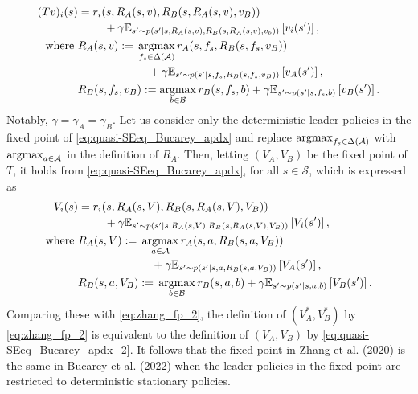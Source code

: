 \documentclass{acml}
\providecommand{\argmax}{\operatornamewithlimits{argmax}} %
\providecommand{\E}{\mathbb{E}} %
\providecommand{\where}{\mathrm{where~}}
\begin{document}
\begin{subequations}\label{eq:quasi-SEeq_Bucarey_apdx}
	\begin{align}
		(Tv)_i(s)&=\begin{multlined}[t]
		    r_i(s,R_A(s,v),R_B(s,R_A(s,v),v_B)) \\
                + \gamma\E_{s'\sim p(s'|s,R_A(s,v),R_B(s,R_A(s,v),v_b))}\left[v_i(s')\right],
		\end{multlined}\\
		\where 
		&R_A(s,v):=\begin{multlined}[t]
		    \argmax_{f_s\in\Delta(\mathcal{A})} r_A(s,f_s,R_B(s,f_s,v_B)) \\
                + \gamma\E_{s'\sim p(s'|s,f_s,R_B(s,f_s,v_B))}\left[v_A(s')\right],
		\end{multlined}\\
		&R_B(s,f_s,v_B):=\argmax_{b\in\mathcal{B}} r_B(s,f_s,b) + \gamma\E_{s'\sim p(s'|s,f_s,b)}\left[v_B(s')\right].
	\end{align}
\end{subequations}
Notably, $\gamma=\gamma_A=\gamma_B$.
Let us consider only the deterministic leader policies in the fixed point of \cref{eq:quasi-SEeq_Bucarey_apdx} and replace $\argmax_{f_s\in\Delta(\mathcal{A})}$ with $\argmax_{a\in\mathcal{A}}$ in the definition of $R_A$.
Then, letting $(V_A,V_B)$ be the fixed point of $T$, it holds from \cref{eq:quasi-SEeq_Bucarey_apdx}, for all $s\in\mathcal{S}$, which is expressed as
\begin{subequations}\label{eq:quasi-SEeq_Bucarey_apdx_2}
	\begin{align}
		V_i(s)&=\begin{multlined}[t]
		    r_i(s,R_A(s,V),R_B(s,R_A(s,V),V_B)) \\
                + \gamma\E_{s'\sim p(s'|s,R_A(s,V),R_B(s,R_A(s,V),V_B))}\left[V_i(s')\right],
		\end{multlined}\\
		\where 
		&R_A(s,V):=\begin{multlined}[t]
		    \argmax_{a\in\mathcal{A}} r_A(s,a,R_B(s,a,V_B)) \\
                + \gamma\E_{s'\sim p(s'|s,a,R_B(s,a,V_B))}\left[V_A(s')\right],
		\end{multlined}\\
		&R_B(s,a,V_B):=\begin{multlined}[t]
		    \argmax_{b\in\mathcal{B}} r_B(s,a,b) 
                + \gamma\E_{s'\sim p(s'|s,a,b)}\left[V_B(s')\right].
		\end{multlined}
	\end{align}
\end{subequations}
Comparing these with \cref{eq:zhang_fp_2}, the definition of $(V_A^*,V_B^*)$ by \cref{eq:zhang_fp_2} is equivalent to the definition of $(V_A,V_B)$ by \cref{eq:quasi-SEeq_Bucarey_apdx_2}.
It follows that the fixed point in Zhang et al. (2020) is the same in Bucarey et al. (2022) when the leader policies in the fixed point are restricted to deterministic stationary policies.
\end{document}

